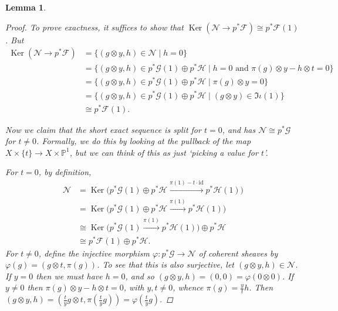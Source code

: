 \documentclass[11pt,fleqn]{article}
\theoremstyle{plain}
\newtheorem{lemma}[theorem]{Lemma}
\theoremstyle{definition}
\theoremstyle{remark}
\numberwithin{equation}{theorem}
\newcommand{\id}{\mathrm{id}}
\DeclareMathOperator{\Ker}{Ker}
\begin{document}
\begin{lemma}
\begin{proof}
                To prove exactness, it suffices to show that $\Ker(\mathcal{N}\to p^*\mathscr{F})\cong p^*\mathscr{F}(1)$.
                But
                \begin{align*}
                    \Ker(\mathcal{N}\to p^*\mathscr{F}) &= \{(g\otimes y, h)\in\mathcal{N} \mid h=0\}\\
                    &= \{(g\otimes y, h)\in p^*\mathscr{G}(1)\oplus p^*\mathscr{H} \mid h=0\text{ and }\pi(g)\otimes y-h\otimes t=0\}\\
                    &= \{(g\otimes y, h)\in p^*\mathscr{G}(1)\oplus p^*\mathscr{H} \mid \pi(g)\otimes y=0\}\\
                    &= \{(g\otimes y, h)\in p^*\mathscr{G}(1)\oplus p^*\mathscr{H} \mid (g\otimes y)\in\Im\iota(1)\}\\
                    &\cong p^*\mathscr{F}(1).
                \end{align*}

                Now we claim that the short exact sequence is split for $t=0$, and has $\mathcal{N}\cong p^*\mathscr{G}$ for $t\neq0$.
                Formally, we do this by looking at the pullback of the map $X\times\{t\}\to X\times\mathbb{P}^1$, but we can think of this as just `picking a value for $t$'.

                For $t=0$, by definition,
                \begin{align*}
                    \mathcal{N} &= \Ker\big(p^*\mathscr{G}(1)\oplus p^*\mathscr{H}\xrightarrow{\pi(1)-t\cdot\id}p^*\mathscr{H}(1)\big)\\
                    &= \Ker\big(p^*\mathscr{G}(1)\oplus p^*\mathscr{H}\xrightarrow{\pi(1)}p^*\mathscr{H}(1)\big)\\
                    &\cong \Ker\big(p^*\mathscr{G}(1)\xrightarrow{\pi(1)}p^*\mathscr{H}(1)\big) \oplus p^*\mathscr{H}\\
                    &\cong p^*\mathscr{F}(1)\oplus p^*\mathscr{H}.
                \end{align*}
                For $t\neq0$, define the injective morphism $\varphi\colon p^*\mathscr{G}\to\mathcal{N}$ of coherent sheaves by $\varphi(g)=(g\otimes t,\pi(g))$.
                To see that this is also surjective, let $(g\otimes y, h)\in\mathcal{N}$.
                If $y=0$ then we must have $h=0$, and so $(g\otimes y, h) = (0,0) = \varphi(0\otimes0)$.
                If $y\neq0$ then $\pi(g)\otimes y-h\otimes t=0$, with $y,t\neq0$, whence $\pi(g)=\frac{y}{t}h$.
                Then $(g\otimes y, h) = (\frac{t}{y}g\otimes t, \pi(\frac{t}{y}g)) = \varphi(\frac{t}{y}g).$


\end{proof}
\end{lemma}
\end{document}
